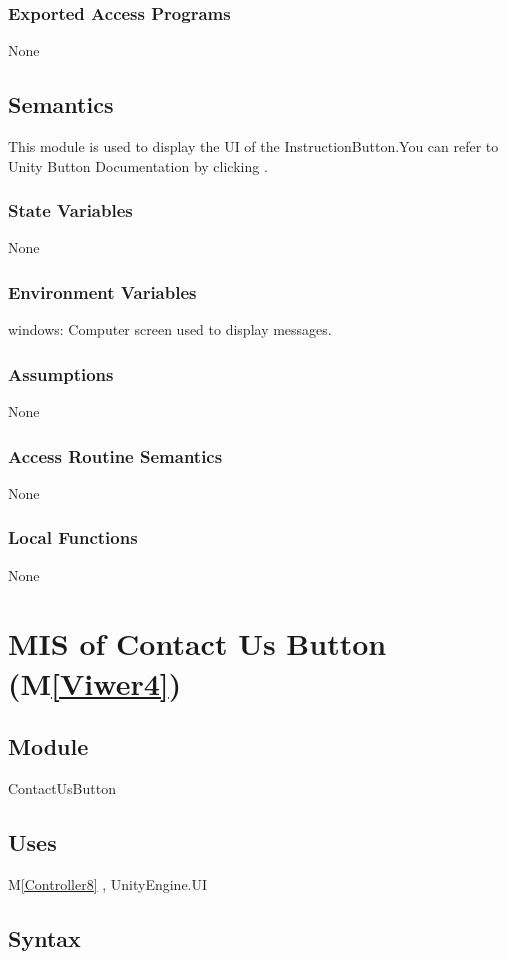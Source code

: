\documentclass[12pt, titlepage]{article}
\newcommand{\mref}[1]{M\ref{#1}}
\begin{document}
\subsubsection{Exported Access Programs}
None

\subsection{Semantics}
This module is used to display the UI of the InstructionButton.You can refer to Unity Button Documentation by clicking \bref.
\subsubsection{State Variables}
None
\subsubsection{Environment Variables}
windows: Computer screen used to display messages.
\subsubsection{Assumptions}
None
\subsubsection{Access Routine Semantics}
None
\subsubsection{Local Functions}
None

\newpage

\section{MIS of Contact Us Button (\mref{Viwer4})}

\subsection{Module}
ContactUsButton

\subsection{Uses}
\mref{Controller8}  , UnityEngine.UI

\subsection{Syntax}
\end{document}
